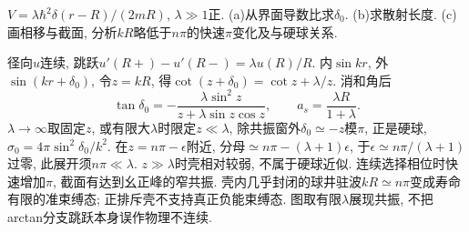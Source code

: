 \begin{exercise}
$V=\lambda\hbar^2\delta(r-R)/(2mR)$, $\lambda\gg1$正. (a)从界面导数比求$\delta_0$. (b)求散射长度. (c)画相移与截面, 分析$kR$略低于$n\pi$的快速$\pi$变化及与硬球关系.
\end{exercise}
\begin{solution}
径向$u$连续, 跳跃$u'(R+)-u'(R-)=\lambda u(R)/R$. 内$\sin kr$, 外$\sin(kr+\delta_0)$, 令$z=kR$, 得$\cot(z+\delta_0)=\cot z+\lambda/z$. 消和角后
\[
\tan\delta_0=-\frac{\lambda\sin^2z}{z+\lambda\sin z\cos z},\qquad
 a_s=\frac{\lambda R}{1+\lambda}.
\]
$\lambda\to\infty$取固定$z$, 或有限大$\lambda$时限定$z\ll\lambda$, 除共振窗外$\delta_0\simeq-z$模$\pi$, 正是硬球,$\sigma_0=4\pi\sin^2\delta_0/k^2$. 在$z=n\pi-\epsilon$附近, 分母$\simeq n\pi-(\lambda+1)\epsilon$, 于$\epsilon\simeq n\pi/(\lambda+1)$过零, 此展开须$n\pi\ll\lambda$. $z\gg\lambda$时壳相对较弱, 不属于硬球近似. 连续选择相位时快速增加$\pi$, 截面有达到幺正峰的窄共振. 壳内几乎封闭的球井驻波$kR\simeq n\pi$变成寿命有限的准束缚态; 正排斥壳不支持真正负能束缚态. 图取有限$\lambda$展现共振, 不把arctan分支跳跃本身误作物理不连续.

\end{solution}

